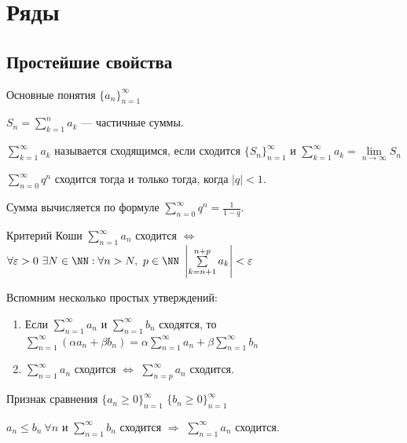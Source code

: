\section{Ряды}

\subsection{Простейшие свойства}

\begin{defn}{Основные понятия}{}
    \( \{ a_n \}_{n = 1}^{\infty} \)

    \( S_n = \sum\limits_{k = 1}^{n} a_k \) --- частичные суммы.

    \( \sum\limits_{k = 1}^{\infty} a_k \) называется сходящимся,
    если сходится \( \{ S_n \}_{n = 1}^{\infty} \)
    и
    \( \sum\limits_{k = 1}^{\infty} a_k = \lim\limits_{n \to \infty} S_n \)
\end{defn}

\begin{example}{}{}
    \( \sum\limits_{n = 0}^{\infty} q^n \) сходится
    тогда и только тогда, когда \( |q| < 1 \).

    Сумма вычисляется по формуле \( \sum\limits_{n = 0}^{\infty} q^n = \frac{1}{1 - q} \).
\end{example}

\begin{assrt}{Критерий Коши}{}
    \( \sum\limits_{n = 1}^{\infty} a_n \)
    сходится
    \( \Leftrightarrow \)
    \(
        \forall \varepsilon > 0 \ \exists N \in \NN :
        \forall n > N, \ p \in \NN \
        \left| \sum\limits_{k = n + 1}^{n + p} a_k \right| < \varepsilon
    \)
\end{assrt}

Вспомним несколько простых утверждений:
\begin{enumerate}
    \item
        Если \( \sum\limits_{n = 1}^{\infty} a_n \) и \( \sum\limits_{n = 1}^{\infty} b_n \)
        сходятся, то
        \(
            \sum\limits_{n = 1}^{\infty} (\alpha a_n + \beta b_n)
            =
            \alpha \sum\limits_{n = 1}^{\infty} a_n
            +
            \beta \sum\limits_{n = 1}^{\infty} b_n
        \)
    \item
        \( \sum\limits_{n = 1}^{\infty} a_n \) сходится
        \( \Leftrightarrow \)
        \( \sum\limits_{n = p}^{\infty} a_n \) сходится.
\end{enumerate}

\begin{assrt}{Признак сравнения}{}
    \( \{ a_n \geq 0 \}_{n = 1}^{\infty} \) \quad \( \{ b_n \geq 0 \}_{n = 1}^{\infty} \)

    \( a_n \leq b_n \ \forall n \) и \( \sum\limits_{n = 1}^{\infty} b_n \) сходится
    \( \Rightarrow \)
    \( \sum\limits_{n = 1}^{\infty} a_n \) сходится.
\end{assrt}


